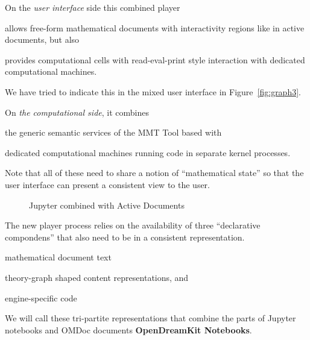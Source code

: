 On the \emph{user interface} side this combined player 
\begin{compactenum}
\item allows free-form mathematical documents with interactivity regions like in active
  documents, but also 
\item provides computational cells with read-eval-print style interaction with dedicated
  computational machines.
\end{compactenum}
We have tried to indicate this in the mixed user interface in Figure~\ref{fig:graph3}. 

On \emph{the computational side}, it combines
\begin{compactenum}
\item the generic semantic services of the MMT Tool based with
\item dedicated computational machines running code in separate kernel processes. 
\end{compactenum}
Note that all of these need to share a notion of ``mathematical state'' so that the user
interface can present a consistent view to the user.

\begin{figure}[ht]
  
  \caption{Jupyter combined with Active Documents}\label{fig:graph4}
\end{figure}

The new player process relies on the availability of three ``declarative compondens'' that
also need to be in a consistent representation. 
\begin{compactenum}
\item mathematical document text 
\item theory-graph shaped content representations, and 
\item engine-specific code 
\end{compactenum}
We will call these tri-partite representations that combine the parts of Jupyter notebooks
and OMDoc documents \textbf{OpenDreamKit Notebooks}.



